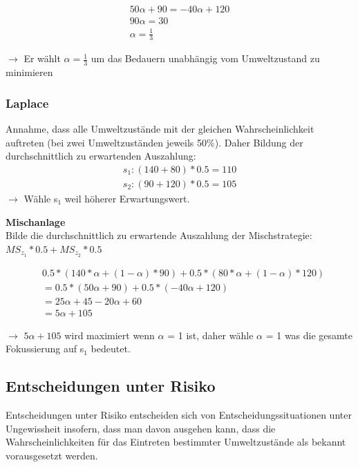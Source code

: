\documentclass[11pt]{article}
\begin{document}
\begin{equation*}
\begin{aligned}
 50\alpha +90 = -40\alpha+120\\
90\alpha = 30\\
\alpha = \frac{1}{3}
\end{aligned}
\end{equation*}

\(\rightarrow\) Er wählt \(\alpha = \frac{1}{3}\) um das Bedauern unabhängig vom Umweltzustand zu minimieren

\subsubsection{Laplace}
\label{sec:org3b72c9a}
Annahme, dass alle Umweltzustände mit der gleichen Wahrscheinlichkeit auftreten (bei zwei Umweltzuständen jeweils 50\%). Daher Bildung der durchschnittlich zu erwartenden Auszahlung:
\begin{equation*}
\begin{aligned}
s_1: (140 + 80) * 0.5 = 110 \\
s_2: (90+120)*0.5=105
\end{aligned}
\end{equation*}
\(\rightarrow\) Wähle s\(_{\text{1}}\) weil höherer Erwartungswert.
\newline

\textbf{Mischanlage}\\
Bilde die durchschnittlich zu erwartende Auszahlung der Mischstrategie: \(MS_{z_1}*0.5+MS_{z_2}*0.5\)

\begin{equation*}
\begin{aligned}
&0.5*(140*\alpha + (1-\alpha)*90) + 0.5*(80*\alpha + (1-\alpha)*120) \\ 
&= 0.5*(50\alpha + 90) + 0.5*(-40\alpha + 120)\\ 
&= 25\alpha + 45 - 20\alpha + 60\\
&= 5\alpha + 105
\end{aligned}
\end{equation*}

\(\rightarrow\) \(5\alpha + 105\) wird maximiert wenn \(\alpha\) = 1 ist, daher wähle \(\alpha\) = 1 was die gesamte Fokussierung auf s\(_{\text{1}}\) bedeutet.\\

\subsection{Entscheidungen unter Risiko}
\label{sec:org02dda8f}
Entscheidungen unter Risiko entscheiden sich von Entscheidungssituationen unter Ungewissheit insofern, dass man davon ausgehen kann, dass die Wahrscheinlichkeiten für das Eintreten bestimmter Umweltzustände als bekannt vorausgesetzt werden. \\
\end{document}
